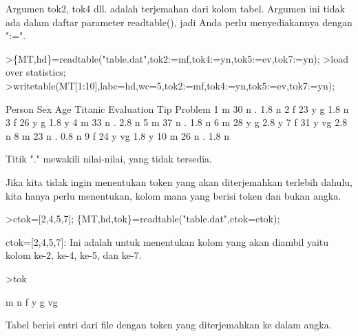 \documentclass[a4paper,10pt]{article}
\begin{document}
\begin{eulernotebook}
\begin{eulercomment}
\begin{eulercomment}
\begin{eulercomment}
Argumen tok2, tok4 dll. adalah terjemahan dari kolom tabel. Argumen
ini tidak ada dalam daftar parameter readtable(), jadi Anda perlu
menyediakannya dengan ":=".
\end{eulercomment}
\begin{eulerprompt}
>\{MT,hd\}=readtable("table.dat",tok2:=mf,tok4:=yn,tok5:=ev,tok7:=yn);
>load over statistics;
>writetable(MT[1:10],labc=hd,wc=5,tok2:=mf,tok4:=yn,tok5:=ev,tok7:=yn);
\end{eulerprompt}
\begin{euleroutput}
   Person  Sex  Age Titanic Evaluation  Tip Problem
        1    m   30       n          .  1.8       n
        2    f   23       y          g  1.8       n
        3    f   26       y          g  1.8       y
        4    m   33       n          .  2.8       n
        5    m   37       n          .  1.8       n
        6    m   28       y          g  2.8       y
        7    f   31       y         vg  2.8       n
        8    m   23       n          .  0.8       n
        9    f   24       y         vg  1.8       y
       10    m   26       n          .  1.8       n
\end{euleroutput}
\begin{eulercomment}
Titik "." mewakili nilai-nilai, yang tidak tersedia.

Jika kita tidak ingin menentukan token yang akan diterjemahkan
terlebih dahulu, kita hanya perlu menentukan, kolom mana yang berisi
token dan bukan angka.
\end{eulercomment}
\begin{eulerprompt}
>ctok=[2,4,5,7]; \{MT,hd,tok\}=readtable("table.dat",ctok=ctok);
\end{eulerprompt}
\begin{eulercomment}
ctok=[2,4,5,7]: Ini adalah untuk menentukan kolom yang akan diambil
yaitu kolom ke-2, ke-4, ke-5, dan ke-7.
\end{eulercomment}
\begin{eulerprompt}
>tok
\end{eulerprompt}
\begin{euleroutput}
  m
  n
  f
  y
  g
  vg
\end{euleroutput}
\begin{eulercomment}
Tabel berisi entri dari file dengan token yang diterjemahkan ke dalam
angka.


\end{eulercomment}
\end{eulercomment}
\end{eulercomment}
\end{eulernotebook}
\end{document}
